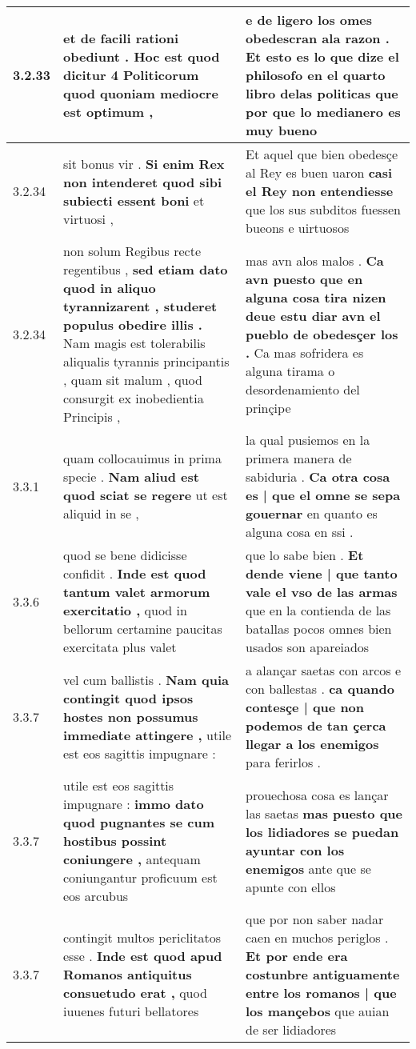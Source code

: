 \begin{tabular}{|p{1cm}|p{6.5cm}|p{6.5cm}|}
3.2.33 & et de facili rationi obediunt . \textbf{ Hoc est quod dicitur 4 Politicorum } quod quoniam mediocre est optimum , & e de ligero los omes obedescran ala razon . \textbf{ Et esto es lo que dize el philosofo en el quarto libro delas politicas } que por que lo medianero es muy bueno \\\hline
3.2.34 & sit bonus vir . \textbf{ Si enim Rex non intenderet quod sibi subiecti essent boni } et virtuosi , & Et aquel que bien obedesçe al Rey es buen uaron \textbf{ casi el Rey non entendiesse } que los sus subditos fuessen bueons e uirtuosos \\\hline
3.2.34 & non solum Regibus recte regentibus , \textbf{ sed etiam dato quod in aliquo tyrannizarent , studeret populus obedire illis . } Nam magis est tolerabilis aliqualis tyrannis principantis , quam sit malum , quod consurgit ex inobedientia Principis , & mas avn alos malos . \textbf{ Ca avn puesto que en alguna cosa tira nizen deue estu diar avn el pueblo de obedesçer los . } Ca mas sofridera es alguna tirama o desordenamiento del prinçipe \\\hline
3.3.1 & quam collocauimus in prima specie . \textbf{ Nam aliud est quod sciat se regere } ut est aliquid in se , & la qual pusiemos en la primera manera de sabiduria . \textbf{ Ca otra cosa es | que el omne se sepa gouernar } en quanto es alguna cosa en ssi . \\\hline
3.3.6 & quod se bene didicisse confidit . \textbf{ Inde est quod tantum valet armorum exercitatio , } quod in bellorum certamine paucitas exercitata plus valet & que lo sabe bien . \textbf{ Et dende viene | que tanto vale el vso de las armas } que en la contienda de las batallas pocos omnes bien usados son apareiados \\\hline
3.3.7 & vel cum ballistis . \textbf{ Nam quia contingit quod ipsos hostes non possumus immediate attingere , } utile est eos sagittis impugnare : & a alançar saetas con arcos e con ballestas . \textbf{ ca quando contesçe | que non podemos de tan çerca llegar a los enemigos } para ferirlos . \\\hline
3.3.7 & utile est eos sagittis impugnare : \textbf{ immo dato quod pugnantes se cum hostibus possint coniungere , } antequam coniungantur proficuum est eos arcubus & prouechosa cosa es lançar las saetas \textbf{ mas puesto que los lidiadores se puedan ayuntar con los enemigos } ante que se apunte con ellos \\\hline
3.3.7 & contingit multos periclitatos esse . \textbf{ Inde est quod apud Romanos antiquitus consuetudo erat , } quod iuuenes futuri bellatores & que por non saber nadar caen en muchos periglos . \textbf{ Et por ende era costunbre antiguamente entre los romanos | que los mançebos } que auian de ser lidiadores \\\hline

\end{tabular}
